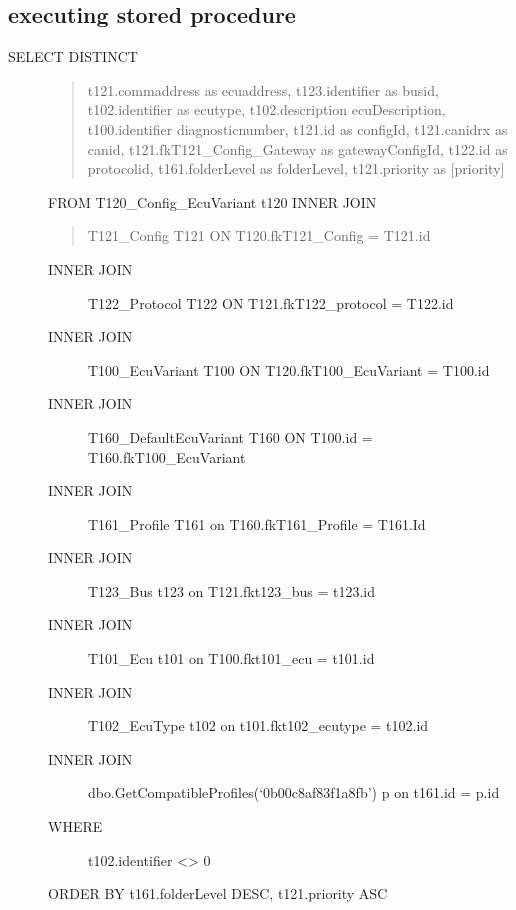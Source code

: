 \documentclass[letterpaper,10pt,english]{sphinxmanual}
\begin{document}
\subsection{executing stored procedure}
\label{\detokenize{canbus/ecutabel:executing-stored-procedure}}\begin{description}
\item[{SELECT  DISTINCT}] \leavevmode\begin{quote}

\sphinxAtStartPar
t121.commaddress as ecuaddress,
t123.identifier as busid,
t102.identifier as ecutype,
t102.description ecuDescription,
t100.identifier diagnosticnumber,
t121.id as configId,
t121.canidrx as canid,
t121.fkT121\_Config\_Gateway as gatewayConfigId,
t122.id as protocolid,
t161.folderLevel as folderLevel,
t121.priority as {[}priority{]}
\end{quote}

\sphinxAtStartPar
FROM      T120\_Config\_EcuVariant t120
INNER JOIN
\begin{quote}

\sphinxAtStartPar
T121\_Config T121 ON T120.fkT121\_Config = T121.id
\end{quote}
\begin{description}
\item[{INNER JOIN}] \leavevmode
\sphinxAtStartPar
T122\_Protocol T122 ON T121.fkT122\_protocol = T122.id

\item[{INNER JOIN}] \leavevmode
\sphinxAtStartPar
T100\_EcuVariant T100 ON T120.fkT100\_EcuVariant = T100.id

\item[{INNER JOIN}] \leavevmode
\sphinxAtStartPar
T160\_DefaultEcuVariant T160 ON T100.id = T160.fkT100\_EcuVariant

\item[{INNER JOIN}] \leavevmode
\sphinxAtStartPar
T161\_Profile T161 on T160.fkT161\_Profile = T161.Id

\item[{INNER JOIN}] \leavevmode
\sphinxAtStartPar
T123\_Bus t123 on T121.fkt123\_bus = t123.id

\item[{INNER JOIN}] \leavevmode
\sphinxAtStartPar
T101\_Ecu t101 on T100.fkt101\_ecu = t101.id

\item[{INNER JOIN}] \leavevmode
\sphinxAtStartPar
T102\_EcuType t102 on t101.fkt102\_ecutype = t102.id

\item[{INNER JOIN}] \leavevmode
\sphinxAtStartPar
dbo.GetCompatibleProfiles(‘0b00c8af83f1a8fb’) p on t161.id = p.id

\item[{WHERE}] \leavevmode
\sphinxAtStartPar
t102.identifier \textless{}\textgreater{} 0

\end{description}

\sphinxAtStartPar
ORDER BY t161.folderLevel DESC, t121.priority ASC

\end{description}
\end{document}
